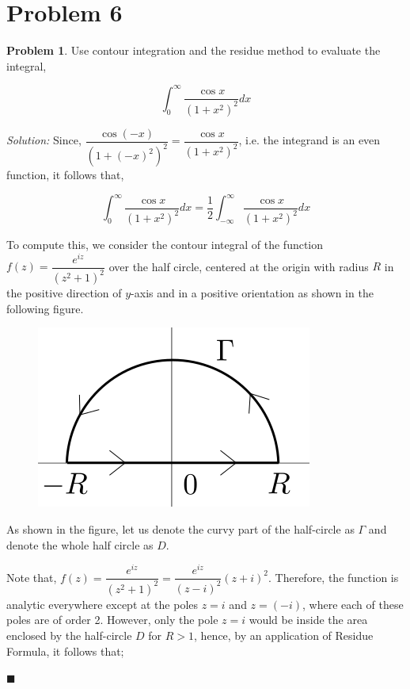 \documentclass[12pt]{article}
\theoremstyle{definition}
\newtheorem*{prb}{Problem}
\newenvironment{problem}{
\begin{tcolorbox}[colback=blue!5!white,colframe=blue!75!black, parbox = true] \begin{prb}  }{\end{prb}\end{tcolorbox} }
\newenvironment{answer}{\textit{Solution: }\quad }{ \hfill $\blacksquare$}
\numberwithin{equation}{section}
\begin{document}
\pagebreak

\section{Problem 6}
\begin{problem}
	Use contour integration and the residue method to evaluate the integral,

	$$\int_{0}^{\infty} \dfrac{\cos x}{(1 + x^2)^2} dx$$
\end{problem}


\begin{answer}
	Since, $\dfrac{\cos (-x)}{(1 + (-x)^2)^2} = \dfrac{\cos x}{(1 + x^2)^2}$, i.e. the integrand is an even function, it follows that,

	\begin{equation}
		\int_{0}^{\infty} \dfrac{\cos x}{(1 + x^2)^2} dx = \dfrac{1}{2} \int_{-\infty}^{\infty} \dfrac{\cos x}{(1 + x^2)^2} dx
		\label{eqn:6-0}		
	\end{equation}

	To compute this, we consider the contour integral of the function $f(z) = \dfrac{e^{iz}}{(z^2 + 1)^2}$ over the half circle, centered at the origin with radius $R$ in the positive direction of $y$-axis and in a positive orientation as shown in the following figure.

	\begin{figure}[h]
		\centering
		\includegraphics[width = 0.5\linewidth]{half-circle.png}
	\end{figure}

	As shown in the figure, let us denote the curvy part of the half-circle as $\Gamma$ and denote the whole half circle as $D$.

	Note that, $f(z) = \dfrac{e^{iz}}{(z^2 + 1)^2} = \dfrac{e^{iz}}{(z-i)^2}(z + i)^2$. Therefore, the function is analytic everywhere except at the poles $z = i$ and $z = (-i)$, where each of these poles are of order 2. However, only the pole $z = i$ would be inside the area enclosed by the half-circle $D$ for $R > 1$, hence, by an application of Residue Formula, it follows that;


\end{answer}
\end{document}
